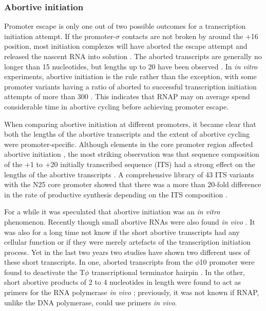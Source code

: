 \subsubsection{Abortive initiation}
Promoter escape is only one out of two possible outcomes for a transcription
initiation attempt. If the promoter-$\sigma$ contacts are not broken by around
the +16 position, most initiation complexes will have aborted the escape
attempt and released the nascent RNA into solution
\cite{lilian_m_promoter_2002}. The aborted transcripts are generally no longer
than 15 nucleotides, but lengths up to 20 have been observed
\cite{chander_alternate_2007}. In \textit{in vitro} experiments, abortive
initiation is the rule rather than the exception, with some promoter variants
having a ratio of aborted to successful transcription initiation attempts of
more than 300 \cite{hsu_initial_2006}. This indicates that RNAP may on average
spend considerable time in abortive cycling before achieving promoter escape.

When comparing abortive initiation at different promoters, it became clear that
both the lengths of the abortive transcripts and the extent of abortive cycling
were promoter-specific. Although elements in the core
promoter region affected abortive initiation \cite{vo_vitro_2003}, the most
striking observation was that sequence composition of the +1 to +20 initially
transcribed sequence (ITS) had a strong effect on the lengths of the
abortive transcripts \cite{hsu_vitro_2003}. A comprehensive library of 43 ITS
variants with the N25 core promoter showed that there was a more than 20-fold
difference in the rate of productive synthesis depending on the ITS composition
\cite{hsu_initial_2006}. 

For a while it was speculated that abortive initiation was an \textit{in vitro}
phenomenon. Recently though small abortive RNAs were also found \textit{in
vivo} \cite{goldman_direct_2009}. It was also for a long time not know if the
short abortive transcripts had any cellular function or if they were merely
artefacts of the transcription initiation process. Yet in the last two years two
studies have shown two different uses of these short transcripts. In one,
aborted transcripts from the $\phi$10 promoter were found to deactivate the
T$\phi$ transcriptional terminator hairpin \cite{lee_tiny_2010}. In the other,
short abortive products of 2 to 4 nucleotides in length were found to act as
primers for the RNA polymerase \textit{in vivo} \cite{goldman_nanornas_2011};
previously, it was not known if RNAP, unlike the DNA polymerase, could use
primers \textit{in vivo}.

